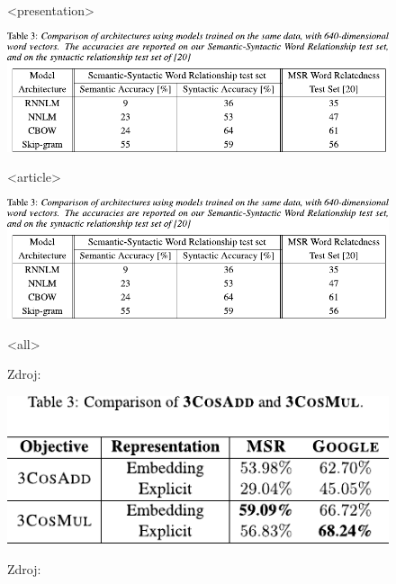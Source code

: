 \begin{frame}
\begin{figure}[H]
\begin{center}

\mode
<presentation>

\includegraphics[width=0.8\paperwidth]{figs/mikolov13a_table3}

\mode
<article>

\includegraphics[width=0.6\paperwidth]{figs/mikolov13a_table3}

\mode
<all>

\bigskip\par
Zdroj: \textcite{mikolov13a}
\end{center}
\end{figure}
\end{frame}


\begin{frame}
\begin{figure}[H]
\begin{center}
\includegraphics[width=0.4\paperwidth]{figs/levy14c_table3}
\bigskip\par
Zdroj: \textcite{levy14c}
\end{center}
\end{figure}
\end{frame}

